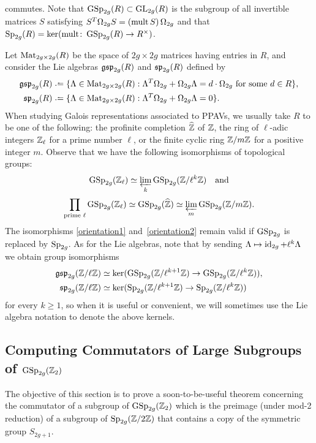 \noindent commutes. Note
that $\operatorname{GSp}_{2g}(R) \subset \operatorname{GL}_{2g}(R)$ is the subgroup of all invertible matrices $S$ satisfying $S^T \Omega_{2g} S = (\operatorname{mult} S) \, \Omega_{2g}$ 
and that $\operatorname{Sp}_{2g}(R) = \ker(\operatorname{mult} \colon \operatorname{GSp}_{2g}(R) \to R^\times)$.

Let $\operatorname{Mat}_{2g \times 2g}(R)$ be the space of $2g \times 2g$ matrices having entries in $R$, and consider the Lie algebras $\mathfrak{gsp}_{2g}(R)$ and $\mathfrak{sp}_{2g}(R)$ defined by 
		\begin{align*}
        \mf{gsp}_{2g}(R) &\defeq \{\Lambda \in \on{Mat}_{2g \times 2g}(R) : \Lambda^T \Omega_{2g} + \Omega_{2g} \Lambda = d \cdot \Omega_{2g} \text{ for some } d \in R \}, \\
			\mf{sp}_{2g}(R) &\defeq \{\Lambda \in \on{Mat}_{2g \times 2g}(R) : \Lambda^T \Omega_{2g} + \Omega_{2g} \Lambda = 0 \}. 
		\end{align*} 
When studying Galois representations associated to PPAVs, we usually take $R$ to be one of the following: the profinite completion $\widehat{\mathbb Z}$ of $\mathbb Z$, the ring of $\ell$-adic integers $\mathbb Z_{\ell}$ for a prime number $\ell$, or the finite cyclic ring $\mathbb Z / m \mathbb Z$ for a positive integer $m$. 
Observe that we have the following isomorphisms of topological groups:
\begin{equation}\label{orientation1}
\operatorname{GSp}_{2g}(\mathbb Z_\ell)   \simeq  \varprojlim_k \operatorname{GSp}_{2g}(\mathbb Z/ \ell^k \mathbb Z) \quad \text{and}
\end{equation}
\begin{equation}\label{orientation2}
\prod_{\text{prime } \ell} \operatorname{GSp}_{2g}(\mathbb Z_\ell) \simeq  \operatorname{GSp}_{2g}(\widehat{\mathbb Z}) \simeq  \varprojlim_m \operatorname{GSp}_{2g}(\mathbb Z / m \mathbb Z).
\end{equation}
The isomorphisms \eqref{orientation1} and~\eqref{orientation2} remain valid if $\operatorname{GSp}_{2g}$ is replaced by $\operatorname{Sp}_{2g}$. As for the Lie algebras, note that by sending $\Lambda \mapsto \operatorname{id}_{2g} + \ell^k \Lambda$ we obtain group isomorphisms
\begin{align*}
\mathfrak{gsp}_{2g}(\mathbb Z/ \ell \mathbb Z) &\simeq \ker(\operatorname{GSp}_{2g}(\mathbb Z/\ell^{k+1} \mathbb Z) \to \operatorname{GSp}_{2g}(\mathbb Z/ \ell^k \mathbb Z)), \\
\mathfrak{sp}_{2g}(\mathbb Z/ \ell \mathbb Z) &\simeq \ker(\operatorname{Sp}_{2g}(\mathbb Z/\ell^{k+1} \mathbb Z) \to \operatorname{Sp}_{2g}(\mathbb Z/ \ell^k \mathbb Z))
\end{align*}
for every $k \geq 1$, so when it is useful or convenient, we will sometimes use the Lie algebra notation to denote the above kernels.


\subsection{Computing Commutators of Large Subgroups of $\operatorname{GSp}_{2g}(\mathbb Z_2)$} \label{mygawdjamesyousabeast}
The objective of this section is to prove a soon-to-be-useful theorem concerning the commutator of a subgroup of $\operatorname{GSp}_{2g}(\mathbb Z_2)$ which is the preimage (under mod-2 reduction) of a subgroup of $\operatorname{Sp}_{2g}({\mathbb Z} / 2 {\mathbb Z})$ that contains a copy of the symmetric group $S_{2g+1}$.

